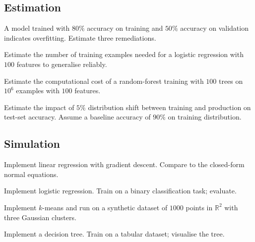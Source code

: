 \subsection*{Estimation}

\begin{exercise}
A model trained with $80\%$ accuracy on training and $50\%$ accuracy on validation indicates overfitting. Estimate three remediations.
\end{exercise}

\begin{exercise}
Estimate the number of training examples needed for a logistic regression with $100$ features to generalise reliably.
\end{exercise}

\begin{exercise}
Estimate the computational cost of a random-forest training with $100$ trees on $10^6$ examples with $100$ features.
\end{exercise}

\begin{exercise}
Estimate the impact of $5\%$ distribution shift between training and production on test-set accuracy. Assume a baseline accuracy of $90\%$ on training distribution.
\end{exercise}

\subsection*{Simulation}

\begin{exercise}
Implement linear regression with gradient descent. Compare to the closed-form normal equations.
\end{exercise}

\begin{exercise}
Implement logistic regression. Train on a binary classification task; evaluate.
\end{exercise}

\begin{exercise}
Implement $k$-means and run on a synthetic dataset of $1000$ points in $\mathbb{R}^2$ with three Gaussian clusters.
\end{exercise}

\begin{exercise}
Implement a decision tree. Train on a tabular dataset; visualise the tree.
\end{exercise}

